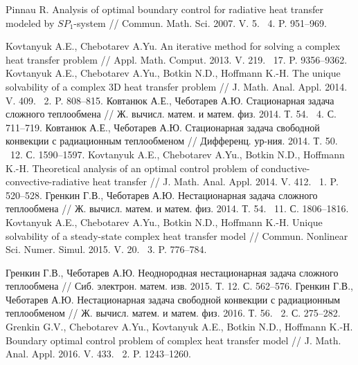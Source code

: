 \begin{thebibliography}{999}

    Pinnau R. Analysis of optimal boundary control for radiative heat transfer modeled by $SP_1$-system //
    Commun. Math. Sci. 2007. V. 5. \textnumero~4. P. 951--969.

    Kovtanyuk A.E., Chebotarev A.Yu. An iterative method for solving a complex heat transfer problem // Appl. Math. Comput. 2013. V. 219. \textnumero~17. P. 9356--9362.
    Kovtanyuk A.E., Chebotarev A.Yu., Botkin N.D., Hoffmann K.-H. The unique solvability of a complex 3D heat transfer problem // J. Math. Anal. Appl. 2014. V. 409. \textnumero~2. P. 808--815.
    Ковтанюк А.Е., Чеботарев А.Ю. Стационарная задача сложного теплообмена // Ж. вычисл. матем. и матем. физ. 2014. Т. 54. \textnumero~4. С. 711--719.
    Ковтанюк А.Е., Чеботарев А.Ю. Стационарная задача свободной конвекции с радиационным теплообменом // Дифференц. ур-ния. 2014. Т. 50. \textnumero~12. С. 1590--1597.
    Kovtanyuk A.E., Chebotarev A.Yu., Botkin N.D., Hoffmann K.-H. Theoretical analysis of an optimal control problem of conductive-convective-radiative heat transfer // J. Math. Anal.
    Appl. 2014. V. 412. \textnumero~1. P. 520--528.
    Гренкин Г.В., Чеботарев А.Ю. Нестационарная задача сложного теплообмена // Ж. вычисл. матем. и матем. физ. 2014. Т. 54. \textnumero~11. С. 1806--1816.
    Kovtanyuk A.E., Chebotarev A.Yu., Botkin N.D., Hoffmann K.-H. Unique solvability of a steady-state complex heat transfer model // Commun. Nonlinear Sci. Numer. Simul. 2015. V. 20. \textnumero~3. P. 776--784.

    Гренкин Г.В., Чеботарев А.Ю. Неоднородная нестационарная задача сложного теплообмена // Сиб. электрон. матем. изв. 2015. Т. 12. С. 562--576.
    Гренкин Г.В., Чеботарев А.Ю. Нестационарная задача свободной конвекции с радиационным теплообменом // Ж. вычисл. матем. и матем. физ. 2016. Т. 56. \textnumero~2. С. 275--282.
    Grenkin G.V., Chebotarev A.Yu., Kovtanyuk A.E., Botkin N.D., Hoffmann K.-H. Boundary optimal control problem of complex heat transfer model // J. Math. Anal. Appl. 2016. V. 433. \textnumero~2. P. 1243--1260.




\end{thebibliography}
